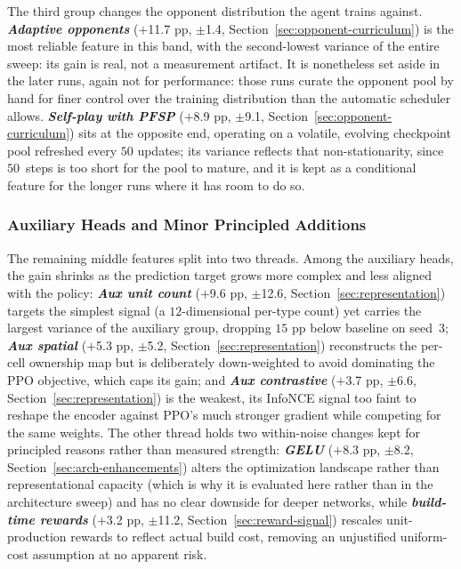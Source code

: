 The third group changes the opponent distribution the agent trains against. \emph{\textbf{Adaptive opponents}} ($+$11.7 pp, $\pm$1.4, Section~\ref{sec:opponent-curriculum}) is the most reliable feature in this band, with the second-lowest variance of the entire sweep: its gain is real, not a measurement artifact. It is nonetheless set aside in the later runs, again not for performance: those runs curate the opponent pool by hand for finer control over the training distribution than the automatic scheduler allows. \emph{\textbf{Self-play with PFSP}} ($+$8.9 pp, $\pm$9.1, Section~\ref{sec:opponent-curriculum}) sits at the opposite end, operating on a volatile, evolving checkpoint pool refreshed every $50$ updates; its variance reflects that non-stationarity, since $50$\, steps is too short for the pool to mature, and it is kept as a conditional feature for the longer runs where it has room to do so.

\subsubsection{Auxiliary Heads and Minor Principled Additions}

The remaining middle features split into two threads. Among the auxiliary heads, the gain shrinks as the prediction target grows more complex and less aligned with the policy: \emph{\textbf{Aux unit count}} ($+$9.6 pp, $\pm$12.6, Section~\ref{sec:representation}) targets the simplest signal (a $12$-dimensional per-type count) yet carries the largest variance of the auxiliary group, dropping $15$ pp below baseline on seed~$3$; \emph{\textbf{Aux spatial}} ($+$5.3 pp, $\pm$5.2, Section~\ref{sec:representation}) reconstructs the per-cell ownership map but is deliberately down-weighted to avoid dominating the PPO objective, which caps its gain; and \emph{\textbf{Aux contrastive}} ($+$3.7 pp, $\pm$6.6, Section~\ref{sec:representation}) is the weakest, its InfoNCE signal too faint to reshape the encoder against PPO's much stronger gradient while competing for the same weights. The other thread holds two within-noise changes kept for principled reasons rather than measured strength: \emph{\textbf{GELU}} ($+$8.3 pp, $\pm$8.2, Section~\ref{sec:arch-enhancements}) alters the optimization landscape rather than representational capacity (which is why it is evaluated here rather than in the architecture sweep) and has no clear downside for deeper networks, while \emph{\textbf{build-time rewards}} ($+$3.2 pp, $\pm$11.2, Section~\ref{sec:reward-signal}) rescales unit-production rewards to reflect actual build cost, removing an unjustified uniform-cost assumption at no apparent risk.

